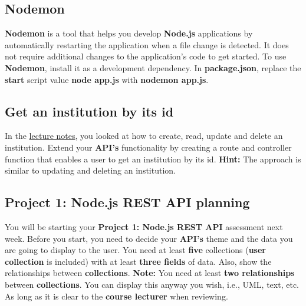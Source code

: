 \documentclass{article}
\begin{document}
\subsection*{Nodemon}
\textbf{Nodemon} is a tool that helps you develop \textbf{Node.js} applications by automatically restarting the application when a file change is detected. It does not require additional changes to the application's code to get started. To use \textbf{Nodemon}, install it as a development dependency. In \textbf{package.json}, replace the \textbf{start} script value \textbf{node app.js} with \textbf{nodemon app.js}.

\subsection*{Get an institution by its id}
In the \href{https://github.com/otago-polytechnic-bit-courses/ID607001-intro-app-dev-concepts/blob/master/lecture-notes/03-node-js-rest-api-1.md}{lecture notes}, you looked at how to create, read, update and delete an institution. Extend your \textbf{API's} functionality by creating a route and controller function that enables a user to get an institution by its id. \textbf{Hint:} The approach is similar to updating and deleting an institution.

\subsection*{Project 1: Node.js REST API planning}
You will be starting your \textbf{Project 1: Node.js REST API} assessment next week. Before you start, you need to decide your \textbf{API's} theme and the data you are going to display to the user. You need at least \textbf{five} collections (\textbf{user collection} is included) with at least \textbf{three fields} of data. Also, show the relationships between \textbf{collections}. \textbf{Note:} You need at least \textbf{two relationships} between \textbf{collections}. You can display this anyway you wish, i.e., UML, text, etc. As long as it is clear to the \textbf{course lecturer} when reviewing.
\end{document}
